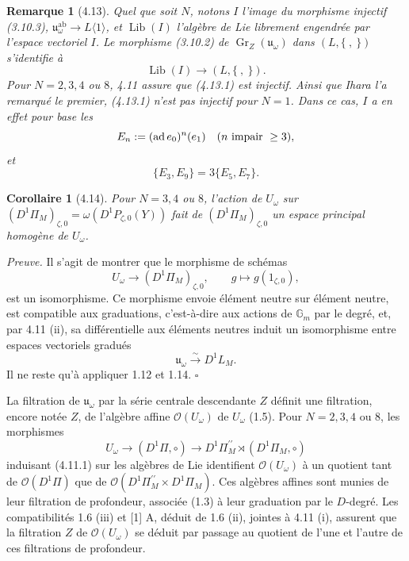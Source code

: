 \documentclass[10pt,a4paper]{article}
\newcommand{\Gm}{\mathbb G_m}
\newcommand{\Gr}{\operatorname{Gr}}
\newcommand{\ad}{\operatorname{ad}}
\newcommand{\OO}{\mathcal O}
\newcommand{\uomega}{\mathfrak u_\omega}
\theoremstyle{deligne}
\newtheorem*{corollary*}{Corollaire}
\newtheorem*{remark*}{Remarque}
\newenvironment{proofdel}{\textit{Preuve.}}{\hfill$\square$}
\newcommand{\heading}[1]{\vspace{0.65em}\noindent{\bfseries #1}\quad}
\begin{document}
\begin{remark*}[4.13]
Quel que soit \(N\), notons \(I\) l'image du morphisme injectif (3.10.3), \(\uomega^{\mathrm{ab}}\to L\langle1\rangle\), et \(\operatorname{Lib}(I)\) l'algèbre de Lie librement engendrée par l'espace vectoriel \(I\). Le morphisme (3.10.2) de \(\Gr_Z(\uomega)\) dans \((L,\{\ ,\ \})\) s'identifie à
\[
\tag{4.13.1}
\operatorname{Lib}(I)\longrightarrow(L,\{\ ,\ \}).
\]
Pour \(N=2,3,4\) ou \(8\), 4.11 assure que (4.13.1) est injectif. Ainsi que Ihara l'a remarqué le premier, (4.13.1) n'est pas injectif pour \(N=1\). Dans ce cas, \(I\) a en effet pour base les
\[
E_n:=(\ad e_0)^n(e_1)\quad(n\hbox{ impair }\ge3),
\]
et
\[
\{E_3,E_9\}=3\{E_5,E_7\}.
\]
\end{remark*}

\begin{corollary*}[4.14]
Pour \(N=3,4\) ou \(8\), l'action de \(U_\omega\) sur \((D^1\Pi_M)_{\zeta,0}=\omega(D^1P_{\zeta,0}(Y))\) fait de \((D^1\Pi_M)_{\zeta,0}\) un espace principal homogène de \(U_\omega\).
\end{corollary*}

\begin{proofdel}
Il s'agit de montrer que le morphisme de schémas
\[
\tag{4.14.1}
U_\omega\longrightarrow(D^1\Pi_M)_{\zeta,0},\qquad g\longmapsto g(1_{\zeta,0}),
\]
est un isomorphisme. Ce morphisme envoie élément neutre sur élément neutre, est compatible aux graduations, c'est-à-dire aux actions de \(\Gm\) par le degré, et, par 4.11 (ii), sa différentielle aux éléments neutres induit un isomorphisme entre espaces vectoriels gradués
\[
\tag{4.14.2}
\uomega\overset{\sim}{\longrightarrow}D^1L_M.
\]
Il ne reste qu'à appliquer 1.12 et 1.14.
\end{proofdel}

\heading{4.15.} La filtration de \(\uomega\) par la série centrale descendante \(Z\) définit une filtration, encore notée \(Z\), de l'algèbre affine \(\OO(U_\omega)\) de \(U_\omega\) (1.5). Pour \(N=2,3,4\) ou \(8\), les morphismes
\[
\tag{4.15.1}
U_\omega\longrightarrow(D^1\Pi,\circ)\longrightarrow D^1\Pi_M^{\prime\prime}\rtimes(D^1\Pi_M,\circ)
\]
induisant (4.11.1) sur les algèbres de Lie identifient \(\OO(U_\omega)\) à un quotient tant de \(\OO(D^1\Pi)\) que de \(\OO(D^1\Pi_M^{\prime\prime}\times D^1\Pi_M)\). Ces algèbres affines sont munies de leur filtration de profondeur, associée (1.3) à leur graduation par le \(D\)-degré. Les compatibilités 1.6 (iii) et [1] A, déduit de 1.6 (ii), jointes à 4.11 (i), assurent que la filtration \(Z\) de \(\OO(U_\omega)\) se déduit par passage au quotient de l'une et l'autre de ces filtrations de profondeur.
\end{document}
